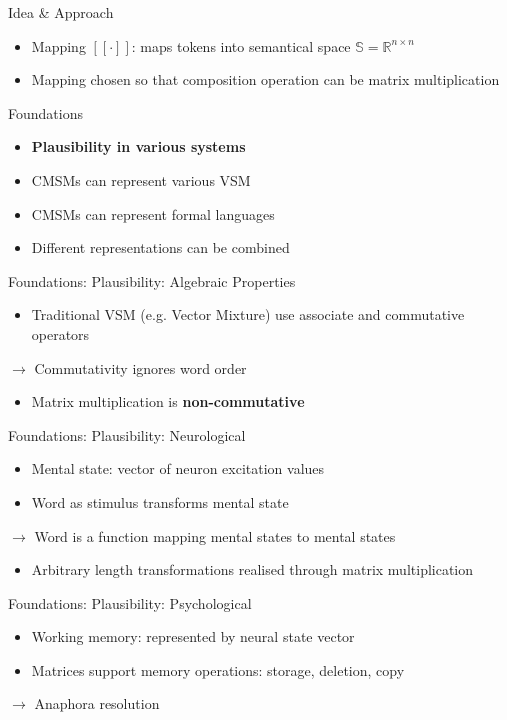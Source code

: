 \documentclass[12pt,a4paper]{beamer}
\begin{document}
\begin{frame}{Idea \& Approach}
\begin{itemize}
\item Mapping $[[\cdot]]$: maps tokens into semantical space $ \mathbb{S}=\mathbb{R}^{n \times n} $
\item Mapping chosen so that composition operation can be matrix multiplication 
\end{itemize}
\end{frame}


\begin{frame}{Foundations}
\begin{itemize}
\item \textbf{Plausibility in various systems}
\item CMSMs can represent various VSM
\item CMSMs can represent formal languages
\item Different representations can be combined
\end{itemize}
\end{frame}

\begin{frame}{Foundations: Plausibility: Algebraic Properties}
\begin{itemize}
\item Traditional VSM (e.g. Vector Mixture) use associate and commutative operators
\end{itemize}
$\to$ Commutativity ignores word order
\begin{itemize}
\item Matrix multiplication is \textbf{non-commutative}
\end{itemize}
\end{frame}

\begin{frame}{Foundations: Plausibility: Neurological}
\begin{itemize}
\item Mental state: vector of neuron excitation values
\item Word as stimulus transforms mental state
\end{itemize}
$\to$ Word is a function mapping mental states to mental states
\begin{itemize}
\item Arbitrary length transformations realised through matrix multiplication
\end{itemize}
\end{frame}

\begin{frame}{Foundations: Plausibility: Psychological}
\begin{itemize}
\item Working memory: represented by neural state vector %
\item Matrices support memory operations: storage, deletion, copy
\end{itemize}
$\to$ Anaphora resolution
\end{frame}
\end{document}
